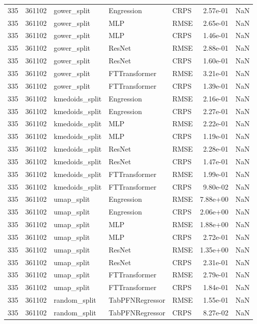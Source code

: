 \begin{tabular}{rrlllrr}
335 & 361102 & gower\_split & Engression & CRPS & 2.57e-01 & NaN \\
335 & 361102 & gower\_split & MLP & RMSE & 2.65e-01 & NaN \\
335 & 361102 & gower\_split & MLP & CRPS & 1.46e-01 & NaN \\
335 & 361102 & gower\_split & ResNet & RMSE & 2.88e-01 & NaN \\
335 & 361102 & gower\_split & ResNet & CRPS & 1.60e-01 & NaN \\
335 & 361102 & gower\_split & FTTransformer & RMSE & 3.21e-01 & NaN \\
335 & 361102 & gower\_split & FTTransformer & CRPS & 1.39e-01 & NaN \\
335 & 361102 & kmedoids\_split & Engression & RMSE & 2.16e-01 & NaN \\
335 & 361102 & kmedoids\_split & Engression & CRPS & 2.27e-01 & NaN \\
335 & 361102 & kmedoids\_split & MLP & RMSE & 2.22e-01 & NaN \\
335 & 361102 & kmedoids\_split & MLP & CRPS & 1.19e-01 & NaN \\
335 & 361102 & kmedoids\_split & ResNet & RMSE & 2.28e-01 & NaN \\
335 & 361102 & kmedoids\_split & ResNet & CRPS & 1.47e-01 & NaN \\
335 & 361102 & kmedoids\_split & FTTransformer & RMSE & 1.99e-01 & NaN \\
335 & 361102 & kmedoids\_split & FTTransformer & CRPS & 9.80e-02 & NaN \\
335 & 361102 & umap\_split & Engression & RMSE & 7.88e+00 & NaN \\
335 & 361102 & umap\_split & Engression & CRPS & 2.06e+00 & NaN \\
335 & 361102 & umap\_split & MLP & RMSE & 1.88e+00 & NaN \\
335 & 361102 & umap\_split & MLP & CRPS & 2.72e-01 & NaN \\
335 & 361102 & umap\_split & ResNet & RMSE & 1.35e+00 & NaN \\
335 & 361102 & umap\_split & ResNet & CRPS & 2.31e-01 & NaN \\
335 & 361102 & umap\_split & FTTransformer & RMSE & 2.79e-01 & NaN \\
335 & 361102 & umap\_split & FTTransformer & CRPS & 1.84e-01 & NaN \\
335 & 361102 & random\_split & TabPFNRegressor & RMSE & 1.55e-01 & NaN \\
335 & 361102 & random\_split & TabPFNRegressor & CRPS & 8.27e-02 & NaN \\

\end{tabular}
